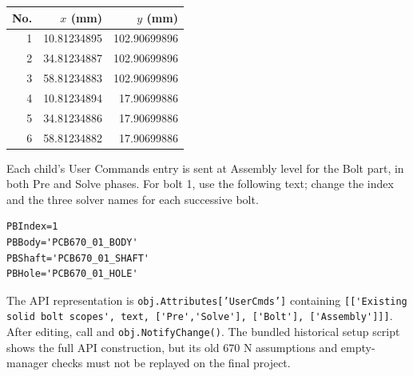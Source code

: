 \documentclass[10pt,a4paper]{article}
\begin{document}
\begin{center}\small\begin{tabular}{r r r}\toprule No. & $x$ (mm) & $y$ (mm)\\\midrule
1 & 10.81234895 & 102.90699896\\2 & 34.81234887 & 102.90699896\\3 & 58.81234883 & 102.90699896\\
4 & 10.81234894 & 17.90699886\\5 & 34.81234886 & 17.90699886\\6 & 58.81234882 & 17.90699886\\\bottomrule\end{tabular}\end{center}
Each child's User Commands entry is sent at Assembly level for the Bolt part, in both Pre and Solve phases. For bolt 1, use the following text; change the index and the three solver names for each successive bolt.

\begin{lstlisting}
PBIndex=1
PBBody='PCB670_01_BODY'
PBShaft='PCB670_01_SHAFT'
PBHole='PCB670_01_HOLE'
\end{lstlisting}

The API representation is \texttt{obj.Attributes['UserCmds']} containing \lstinline![['Existing solid bolt scopes', text, ['Pre','Solve'], ['Bolt'], ['Assembly']]]!. After editing, call  and \texttt{obj.NotifyChange()}. The bundled historical setup script shows the full API construction, but its old 670 N assumptions and empty-manager checks must not be replayed on the final project.
\end{document}
